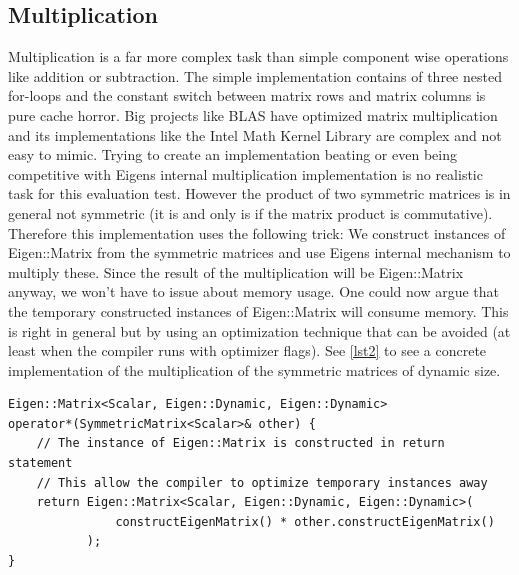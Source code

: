 \documentclass[a4wide]{scrartcl}
\begin{document}
\subsection{Multiplication}
Multiplication is a far more complex task than simple component wise operations like addition or subtraction. The simple implementation contains of three nested for-loops and the constant switch between matrix rows and matrix columns is pure cache horror. Big projects like BLAS have optimized matrix multiplication and its implementations like the Intel Math Kernel Library are complex and not easy to mimic. Trying to create an implementation beating or even being competitive with Eigens internal multiplication implementation is no realistic task for this evaluation test.\newline
However the product of two symmetric matrices is in general not symmetric (it is and only is if the matrix product is commutative). Therefore this implementation uses the following trick: We construct instances of Eigen::Matrix from the symmetric matrices and use Eigens internal mechanism to multiply these. Since the result of the multiplication will be Eigen::Matrix anyway, we won't have to issue about memory usage.\newline
One could now argue that the temporary constructed instances of Eigen::Matrix will consume memory. This is right in general but by using an optimization technique that can be avoided (at least when the compiler runs with optimizer flags). See \autoref{lst2} to see a concrete implementation of the multiplication of the symmetric matrices of dynamic size.
\begin{table}
\begin{lstlisting}[caption={Overloaded operator $*$ for the multiplication of two dynamically sized matrices.},label=lst2]
Eigen::Matrix<Scalar, Eigen::Dynamic, Eigen::Dynamic>
operator*(SymmetricMatrix<Scalar>& other) {
    // The instance of Eigen::Matrix is constructed in return statement
    // This allow the compiler to optimize temporary instances away
    return Eigen::Matrix<Scalar, Eigen::Dynamic, Eigen::Dynamic>(
               constructEigenMatrix() * other.constructEigenMatrix()
           );
}
\end{lstlisting}
\end{table}
\end{document}

